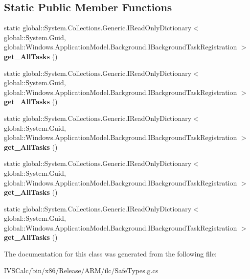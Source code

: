 \subsection*{Static Public Member Functions}
\begin{DoxyCompactItemize}
\item 
\mbox{\label{class_windows_1_1_application_model_1_1_background_1_1_background_task_registration_a7524c6aa57a256726fef8b63bde6c569}} 
static global\+::\+System.\+Collections.\+Generic.\+I\+Read\+Only\+Dictionary$<$ global\+::\+System.\+Guid, global\+::\+Windows.\+Application\+Model.\+Background.\+I\+Background\+Task\+Registration $>$ {\bfseries get\+\_\+\+All\+Tasks} ()
\item 
\mbox{\label{class_windows_1_1_application_model_1_1_background_1_1_background_task_registration_a7524c6aa57a256726fef8b63bde6c569}} 
static global\+::\+System.\+Collections.\+Generic.\+I\+Read\+Only\+Dictionary$<$ global\+::\+System.\+Guid, global\+::\+Windows.\+Application\+Model.\+Background.\+I\+Background\+Task\+Registration $>$ {\bfseries get\+\_\+\+All\+Tasks} ()
\item 
\mbox{\label{class_windows_1_1_application_model_1_1_background_1_1_background_task_registration_a7524c6aa57a256726fef8b63bde6c569}} 
static global\+::\+System.\+Collections.\+Generic.\+I\+Read\+Only\+Dictionary$<$ global\+::\+System.\+Guid, global\+::\+Windows.\+Application\+Model.\+Background.\+I\+Background\+Task\+Registration $>$ {\bfseries get\+\_\+\+All\+Tasks} ()
\item 
\mbox{\label{class_windows_1_1_application_model_1_1_background_1_1_background_task_registration_a7524c6aa57a256726fef8b63bde6c569}} 
static global\+::\+System.\+Collections.\+Generic.\+I\+Read\+Only\+Dictionary$<$ global\+::\+System.\+Guid, global\+::\+Windows.\+Application\+Model.\+Background.\+I\+Background\+Task\+Registration $>$ {\bfseries get\+\_\+\+All\+Tasks} ()
\item 
\mbox{\label{class_windows_1_1_application_model_1_1_background_1_1_background_task_registration_a7524c6aa57a256726fef8b63bde6c569}} 
static global\+::\+System.\+Collections.\+Generic.\+I\+Read\+Only\+Dictionary$<$ global\+::\+System.\+Guid, global\+::\+Windows.\+Application\+Model.\+Background.\+I\+Background\+Task\+Registration $>$ {\bfseries get\+\_\+\+All\+Tasks} ()
\end{DoxyCompactItemize}


The documentation for this class was generated from the following file\+:\begin{DoxyCompactItemize}
\item 
I\+V\+S\+Calc/bin/x86/\+Release/\+A\+R\+M/ilc/Safe\+Types.\+g.\+cs\end{DoxyCompactItemize}
